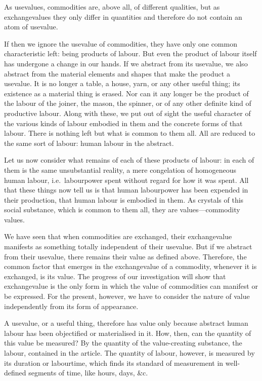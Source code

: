 As usevalues, 
commodities are, above all, of different qualities,
but as exchangevalues they only differ in quantities
and therefore do not contain an atom of usevalue.

If then we ignore the usevalue of commodities, 
they have only one common characteristic left:
being products of labour.
But even the product of labour itself 
has undergone a change in our hands. 
If we abstract from its usevalue, 
we also abstract from the material elements and shapes 
that make the product a usevalue.
It is no longer a table, a house, yarn, or any other useful thing;
its existence as a material thing 
is erased. 
Nor can it any longer be  
the product of the labour of 
the joiner, the mason, the spinner, or of any other definite kind of productive labour. 
Along with these, 
we put out of sight 
the useful character of the various kinds of labour embodied in them
and the concrete forms of that labour.
There is nothing left but what is common to them all.
All are reduced to the same sort of labour: 
human labour in the abstract.

Let us now consider what remains of each of these products of labour:
in each of them is the same unsubstantial reality, 
a mere congelation of homogeneous human labour, 
i.e.~labourpower spent without regard for how it was spent. 
All that these things now tell us is that 
human labourpower has been expended in their production, 
that human labour is embodied in them. 
As crystals of this social substance, 
which is common to them all, 
they are values---commodity values.

We have seen that when commodities are exchanged, 
their exchangevalue manifests 
as something totally independent of their usevalue. 
But if we abstract from their usevalue, 
there remains their value as defined above. 
Therefore, 
the common factor that emerges 
in the exchangevalue of a commodity, 
whenever it is exchanged, 
is its value. 
The progress of our investigation 
will show that exchangevalue 
is the only form in which 
the value of commodities 
can manifest or be expressed. 
For the present, however, 
we have to consider the nature of value 
independently from its form of appearance.

A usevalue, or a useful thing, 
therefore has value 
only because abstract human labour has been objectified or materialised in it.
How, then, can the quantity of this value be measured?
By the quantity of the value-creating substance,
the labour,
contained in the article.
The quantity of labour, however, is measured by its duration or labourtime,
which finds its standard of measurement 
in well-defined segments of time, like hours, days, \&c.


